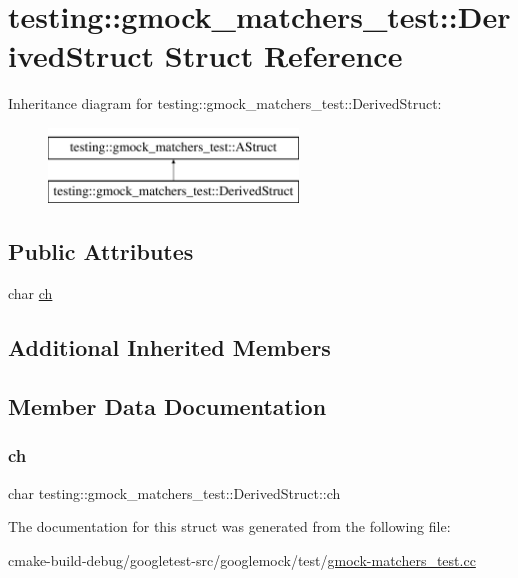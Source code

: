 \hypertarget{structtesting_1_1gmock__matchers__test_1_1DerivedStruct}{}\section{testing\+::gmock\+\_\+matchers\+\_\+test\+::Derived\+Struct Struct Reference}
\label{structtesting_1_1gmock__matchers__test_1_1DerivedStruct}
Inheritance diagram for testing\+::gmock\+\_\+matchers\+\_\+test\+::Derived\+Struct\+:\begin{figure}[H]
\begin{center}
\leavevmode
\includegraphics[height=2.000000cm]{structtesting_1_1gmock__matchers__test_1_1DerivedStruct}
\end{center}
\end{figure}
\subsection*{Public Attributes}
\begin{DoxyCompactItemize}
\item 
char \mbox{\hyperlink{structtesting_1_1gmock__matchers__test_1_1DerivedStruct_abd7de960817b2c889f109ae6f2869f4c}{ch}}
\end{DoxyCompactItemize}
\subsection*{Additional Inherited Members}


\subsection{Member Data Documentation}
\mbox{\label{structtesting_1_1gmock__matchers__test_1_1DerivedStruct_abd7de960817b2c889f109ae6f2869f4c}} 
\subsubsection{\texorpdfstring{ch}{ch}}
{\footnotesize\ttfamily char testing\+::gmock\+\_\+matchers\+\_\+test\+::\+Derived\+Struct\+::ch}



The documentation for this struct was generated from the following file\+:\begin{DoxyCompactItemize}
\item 
cmake-\/build-\/debug/googletest-\/src/googlemock/test/\mbox{\hyperlink{gmock-matchers__test_8cc}{gmock-\/matchers\+\_\+test.\+cc}}\end{DoxyCompactItemize}
